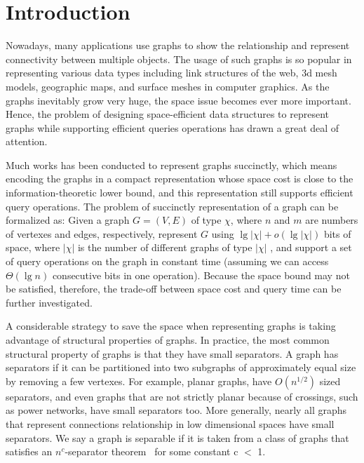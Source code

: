 \documentclass[12pt,glossary]{dalthesis}
\begin{document}
\mainmatter

\chapter{Introduction}

Nowadays, many applications use graphs to show the relationship and represent connectivity between multiple objects. The usage of such graphs is so popular in representing various data types including link structures of the web, 3d mesh models, geographic maps, and surface meshes in computer graphics. As the graphs inevitably grow very huge, the space issue becomes ever more important. Hence, the problem of designing space-efficient data structures to represent graphs while supporting efficient queries operations has drawn a great deal of attention. 

\bigskip
Much works has been conducted to represent graphs succinctly, which means encoding the graphs in a compact representation whose space cost is close to the information-theoretic lower bound, and this representation still supports efficient query operations. The problem of succinctly representation of a graph can be formalized as: Given a graph $G = (V, E)$ of type $\chi$, where $n$ and $m$ are numbers of vertexes and edges, respectively, represent $G$ using $\lg | \chi | + o(\lg | \chi | )$ bits of space, where $|\chi|$ is the number of different graphs of type $|\chi|$ , and support a set of query operations on the graph in constant time (assuming we can access $\Theta(\lg n)$ consecutive bits in one operation). Because the space bound may not be satisfied, therefore, the trade-off between space cost and query time can be further investigated.  

\bigskip


A considerable strategy to save the space when representing graphs is taking advantage of structural properties of graphs. In practice, the most common structural property of graphs is that they have small separators. A graph has separators if it can be partitioned into two subgraphs of approximately equal size by removing a few vertexes. For example, planar graphs, have $O(n^{1/2})$ sized separators, and even graphs that are not strictly planar because of crossings, such as power networks, have small separators too. More generally, nearly all graphs that represent connections relationship in low dimensional spaces have small separators. We say a graph is separable if it is taken from a class of graphs that satisfies an $n^{c}$-separator theorem~\cite{separator-theorem} for some constant c $<$ 1.
\end{document}
